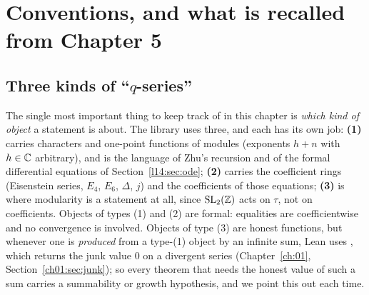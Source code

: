 \section{Conventions, and what is recalled from Chapter 5}\label{l14:sec:recall}

\subsection{Three kinds of ``$q$-series''}\label{l14:sec:threekinds}

The single most important thing to keep track of in this chapter is \emph{which kind of object} a statement is about. The
library uses three, and each has its own job: \textbf{(1)} carries characters and one-point functions of modules (exponents
$h+n$ with $h\in{\mathbb{C}}$ arbitrary), and is the language of Zhu's recursion and of the formal differential equations of
Section~\ref{l14:sec:ode}; \textbf{(2)} carries the coefficient rings (Eisenstein series, $E_4$, $E_6$, $\Delta$, $j$) and the
coefficients of those equations; \textbf{(3)} is where modularity is a statement at all, since $\mathrm{SL}_2(\mathbb{Z})$ acts on $\tau$, not on
coefficients. Objects of types (1) and (2) are formal: equalities are coefficientwise and no convergence is involved. Objects
of type (3) are honest functions, but whenever one is \emph{produced} from a type-(1) object by an infinite sum, Lean uses
, which returns the junk value $0$ on a divergent series (Chapter~\ref{ch:01}, Section~\ref{ch01:sec:junk}); so every
theorem that needs the honest value of such a sum carries a summability or growth hypothesis, and we point this out each
time.
